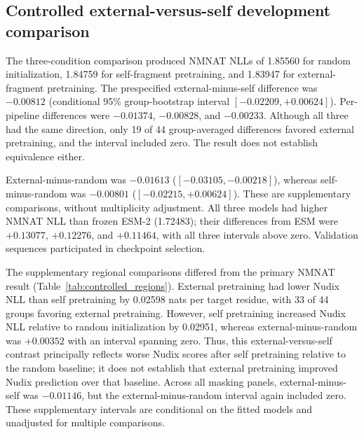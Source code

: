 \documentclass[referee,pdflatex,sn-vancouver-num]{sn-jnl}
\begin{document}
\subsection{Controlled external-versus-self development comparison}
The three-condition comparison produced NMNAT NLLs of 1.85560 for random initialization, 1.84759 for self-fragment pretraining, and 1.83947 for external-fragment pretraining. The prespecified external-minus-self difference was $-0.00812$ (conditional 95\% group-bootstrap interval $[-0.02209,+0.00624]$). Per-pipeline differences were $-0.01374$, $-0.00828$, and $-0.00233$. Although all three had the same direction, only 19 of 44 group-averaged differences favored external pretraining, and the interval included zero. The result does not establish equivalence either.

External-minus-random was $-0.01613$ ($[-0.03105,-0.00218]$), whereas self-minus-random was $-0.00801$ ($[-0.02215,+0.00624]$). These are supplementary comparisons, without multiplicity adjustment. All three models had higher NMNAT NLL than frozen ESM-2 (1.72483); their differences from ESM were $+0.13077$, $+0.12276$, and $+0.11464$, with all three intervals above zero. Validation sequences participated in checkpoint selection.

The supplementary regional comparisons differed from the primary NMNAT result (Table~\ref{tab:controlled_regions}). External pretraining had lower Nudix NLL than self pretraining by 0.02598 nats per target residue, with 33 of 44 groups favoring external pretraining. However, self pretraining increased Nudix NLL relative to random initialization by 0.02951, whereas external-minus-random was $+0.00352$ with an interval spanning zero. Thus, this external-versus-self contrast principally reflects worse Nudix scores after self pretraining relative to the random baseline; it does not establish that external pretraining improved Nudix prediction over that baseline. Across all masking panels, external-minus-self was $-0.01146$, but the external-minus-random interval again included zero. These supplementary intervals are conditional on the fitted models and unadjusted for multiple comparisons.
\end{document}
